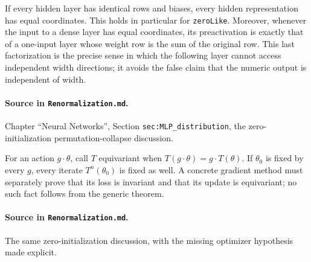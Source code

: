 \begin{theorem}
\label{thm:renorm:zeroCollapse}
If every hidden layer has identical rows and biases, every hidden representation has equal
coordinates.  This holds in particular for \texttt{zeroLike}.  Moreover, whenever the input to a
dense layer has equal coordinates, its preactivation is exactly that of a one-input layer whose
weight row is the sum of the original row.  This last factorization is the precise sense in which
the following layer cannot access independent width directions; it avoids the false claim that
the numeric output is independent of width.

\paragraph{Source in \texttt{Renormalization.md}.}
Chapter ``Neural Networks'', Section \texttt{sec:MLP\_distribution}, the zero-initialization
permutation-collapse discussion.
\end{theorem}

\begin{theorem}
\label{thm:renorm:equivariantTraining}
For an action $g\cdot\theta$, call $T$ equivariant when
$T(g\cdot\theta)=g\cdot T(\theta)$.  If $\theta_0$ is fixed by every $g$, every iterate
$T^n(\theta_0)$ is fixed as well.  A concrete gradient method must separately prove that its loss
is invariant and that its update is equivariant; no such fact follows from the generic theorem.

\paragraph{Source in \texttt{Renormalization.md}.}
The same zero-initialization discussion, with the missing optimizer hypothesis made explicit.
\end{theorem}

